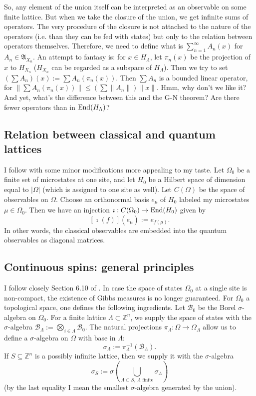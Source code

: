 \begin{ths}
So, any element of the union itself can be interpreted as an observable on some finite lattice. But when we take the closure of the union, we get infinite sums of operators. The very procedure of the closure is not attached to the nature of the operators (i.e. than they can be fed with states) but only to the relation between operators themselves. Therefore, we need to define what is $\sum_{n=1}^\infty A_n (x)$ for $A_n \in \mathfrak A_{X_n}$. An attempt to fantasy is: for $x \in H_{\Lambda}$, let $\pi_n(x)$ be the projection of $x$ to $H_{X_n}$ ($H_{X_n}$ can be regarded as a subspace of $H_{\Lambda}$). Then we try to set $(\sum A_{n})(x):= \sum A_n(\pi_n(x))$. Then $\sum A_{n}$ is a bounded linear operator, for $\|\sum A_n(\pi_n(x))\| \leq (\sum \|A_n\|)\|x\|$. Hmm, why don't we like it? And yet, what's the difference between this and the G-N theorem? Are there fewer operators than in $\operatorname{End}(H_{\Lambda})$?
\end{ths}

\subsection{Relation between classical and quantum lattices}
I follow \cite{israel} with some minor modifications more appealing to my taste. Let $\Omega_0$ be a finite set of microstates at one site, and let $H_0$ be a Hilbert space of dimension equal to $|\Omega|$ (which is assigned to one site as well). Let $C(\Omega)$ be the space of observables on $\Omega$. Choose an orthonormal basis $e_{\mu}$ of $H_0$ labeled my microstates $\mu \in \Omega_0$. Then we have an injection $\imath : C(\Omega_0) \rightarrow \operatorname{End}(H_0)$ given by
\[
[\imath(f)](e_{\mu}) := e_{f(\mu)}.
\]
In other words, the classical observables are embedded into the quantum observables as diagonal matrices.

\subsection{Continuous spins: general principles}\label{ss:gen_princ}
I follow closely Section 6.10 of \cite{friedli}. In case the space of states $\Omega_0$ at a single site is non-compact, the existence of Gibbs measures is no longer guaranteed. For $\Omega_0$ a topological space, one defines the following ingredients. Let $\mathcal B_0$ be the Borel $\sigma$-algebra on $\Omega_0$. For a finite lattice $\Lambda \subset \mathbb Z^n$, we supply the space of states with the $\sigma$-algebra $\mathcal B_{\Lambda} := \bigotimes_{i \in \Lambda} \mathcal B_0$. The natural projections $\pi_{\Lambda} : \Omega \rightarrow \Omega_{\Lambda}$ allow us to define a $\sigma$-algebra on $\Omega$ with base in $\Lambda$:
\[
\sigma_{\Lambda} := \pi^{-1}_{\Lambda}(\mathcal B_{\Lambda}).
\]
If $S \subseteq \mathbb Z^n$ is a possibly infinite lattice, then we supply it with the $\sigma$-algebra
\[
\sigma_{S} := \sigma(\bigcup_{\Lambda \subset S, \ \Lambda \text{ finite}} \sigma_{\Lambda})
\]
(by the last equality I mean the smallest $\sigma$-algebra generated by the union).